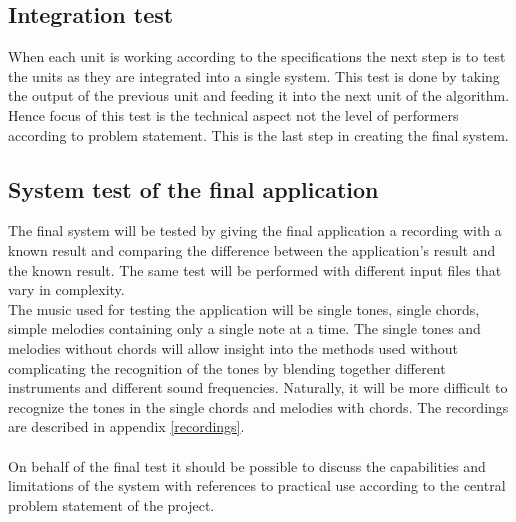 \subsection{Integration test}
When each unit is working according to the specifications the next step is to test the units as they are integrated into a single system. This test is done by taking the output of the previous unit and feeding it into the next unit of the algorithm. Hence focus of this test is the technical aspect not the level of performers according to problem statement. This is the last step in creating the final system.

\subsection{System test of the final application}
The final system will be tested by giving the final application a recording with a known result and comparing the difference between the application's result and the known result. The same test will be performed with different input files that vary in complexity.
\\
The music used for testing the application will be single tones, single chords, simple melodies containing only a single note at a time. The single tones and melodies without chords will allow insight into the methods used without complicating the recognition of the tones by blending together different instruments and different sound frequencies. Naturally, it will be more difficult to recognize the tones in the single chords and melodies with chords. The recordings are described in appendix \ref{recordings}. \\
\\
On behalf of the final test it should be possible to discuss the capabilities and limitations of the system with references to practical use according to the central problem statement of the project.  